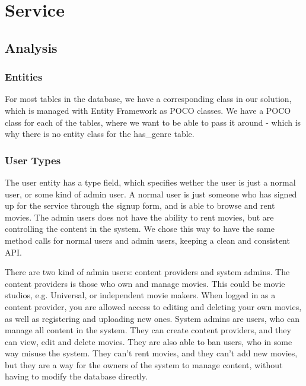 \section{Service}
\label{Design_Service}

\subsection{Analysis}
\label{Design_Service_Analysis}

\subsubsection{Entities}
\label{Design_Service_Analysis_Entities}
For most tables in the database, we have a corresponding class in our solution, which is managed with Entity Framework as POCO classes. We have a POCO class for each of the tables, where we want to be able to pass it around - which is why there is no entity class for the has_genre table. 

\subsubsection{User Types}
\label{Design_Service_Analysis_UserTypes}
The user entity has a type field, which specifies wether the user is just a normal user, or some kind of admin user. A normal user is just someone who has signed up for the service through the signup form, and is able to browse and rent movies. The admin users does not have the ability to rent movies, but are controlling the content in the system. We chose this way to have the same method calls for normal users and admin users, keeping a clean and consistent API. 

There are two kind of admin users: content providers and system admins. The content providers is those who own and manage movies. This could be movie studios, e.g. Universal, or independent movie makers. When logged in as a content provider, you are allowed access to editing and deleting your own movies, as well as registering and uploading new ones. System admins are users, who can manage all content in the system. They can create content providers, and they can view, edit and delete movies. They are also able to ban users, who in some way misuse the system. They can't rent movies, and they can't add new movies, but they are a way for the owners of the system to manage content, without having to modify the database directly.

